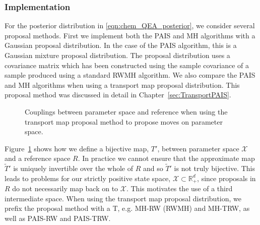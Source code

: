 \documentclass[final]{siamltex}
\newcommand\irregularcircle[2]{%
  \pgfextra {\pgfmathsetmacro\len{(#1)+rand*(#2)}}
  +(0:\len pt)
  \foreach \a in {10,20,...,350}{
    \pgfextra {\pgfmathsetmacro\len{(#1)+rand*(#2)}}
    -- +(\a:\len pt)
  } -- cycle
}
\begin{document}
\subsubsection{Implementation}\label{sec:chem_implementation}

For the posterior distribution in \eqref{eqn:chem_QEA_posterior}, we consider several proposal methods. First we implement both the PAIS and MH algorithms with a Gaussian proposal distribution. In the case of the PAIS algorithm, this is a Gaussian mixture proposal distribution. The proposal distribution uses a covariance matrix which has been constructed using the sample covariance of a sample produced using a standard RWMH algorithm. We also compare the PAIS and MH algorithms when using a transport map proposal distribution. This proposal method was discussed in detail in Chapter~\ref{sec:TransportPAIS}.

\begin{figure}
	\centering
	\caption{Couplings between parameter space and reference when using the transport map proposal method to propose moves on parameter space.}
	\label{fig:chem_coupling}
\end{figure}

Figure~\ref{fig:chem_coupling} shows how we define a bijective map, $T'$, between parameter space $\mathcal{X}$ and a reference space $R$. In practice we cannot ensure that the approximate map $\tilde{T}'$ is uniquely invertible over the whole of $R$ and so $\tilde{T}'$ is not truly bijective. This leads to problems for our strictly positive state space, $\mathcal{X} \subset \mathbb{R}_+^d$, since proposals in $R$ do not necessarily map back on to $\mathcal{X}$. This motivates the use of a third intermediate space. When using the transport map proposal distribution, we prefix the proposal method with a T, e.g. MH-RW (RWMH) and MH-TRW, as well as PAIS-RW and PAIS-TRW.
\end{document}
